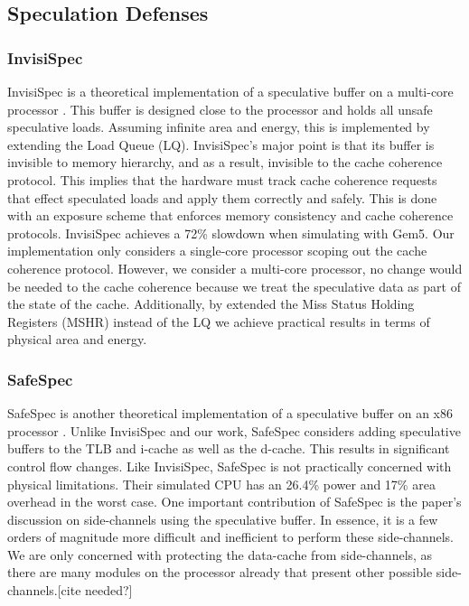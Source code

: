\subsection{Speculation Defenses}

\subsubsection{InvisiSpec}

InvisiSpec is a theoretical implementation of a speculative buffer on a multi-core
processor \cite{b46}. This buffer is designed close to the processor and holds all unsafe speculative loads.
Assuming infinite area and energy, this is implemented by extending the Load Queue (LQ).
InvisiSpec's major point is that its buffer is invisible to memory hierarchy, and as a result,
invisible to the cache coherence protocol. This implies that the hardware must track cache
coherence requests that effect speculated loads and apply them correctly and safely. This is
done with an exposure scheme that enforces memory consistency and cache coherence protocols.
InvisiSpec achieves a 72\% slowdown when simulating with Gem5. Our implementation only
considers a single-core processor scoping out the cache coherence protocol. However, we consider
a multi-core processor, no change would be needed to the cache coherence because we treat the
speculative data as part of the state of the cache. Additionally, by extended the Miss
Status Holding Registers (MSHR) instead of the LQ we achieve practical results in terms
of physical area and energy.

\subsubsection{SafeSpec}

SafeSpec is another theoretical implementation of a speculative buffer on an x86 processor \cite{b29}.
Unlike InvisiSpec and our work, SafeSpec considers adding speculative buffers to the TLB and 
i-cache as well as the d-cache. This results in significant control flow changes.
Like InvisiSpec, SafeSpec is not practically concerned with physical limitations.
Their simulated CPU has an 26.4\% power and 17\% area overhead in the worst case. One
important contribution of SafeSpec is the paper's discussion on side-channels using the speculative
buffer. In essence, it is a few orders of magnitude more difficult and inefficient to perform
these side-channels. We are only concerned with protecting the data-cache from side-channels, as
there are many modules on the processor already that present other possible side-channels.[cite needed?]

